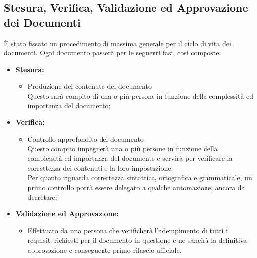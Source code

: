 \subsection{Stesura, Verifica, Validazione ed Approvazione dei Documenti}
È stato fissato un procedimento di massima generale per il ciclo di vita dei documenti. Ogni documento passerà per le seguenti fasi, così composte:
\begin{itemize}
    \item \textbf{Stesura:}
    \begin{itemize}
        \item Produzione del contenuto del documento\\Questo sarà compito di una o più persone in funzione della complessità ed importanza del documento;
    \end{itemize}
    \item \textbf{Verifica:}
    \begin{itemize}
        \item Controllo approfondito del documento\\
		Questo compito impegnerà una o più persone in funzione della complessità ed importanza del documento e servirà per verificare la correttezza dei contenuti e la loro impostazione.\\Per quanto riguarda correttezza sintattica, ortografica e grammaticale, un primo controllo potrà essere delegato a qualche automazione, ancora da decretare;
    \end{itemize}
    \item \textbf{Validazione ed Approvazione:}
    \begin{itemize}
        \item Effettuato da una persona che verificherà l'adempimento di tutti i requisiti richiesti per il documento in questione e ne sancirà la definitiva approvazione e conseguente primo rilascio ufficiale.
    \end{itemize}
\end{itemize}

